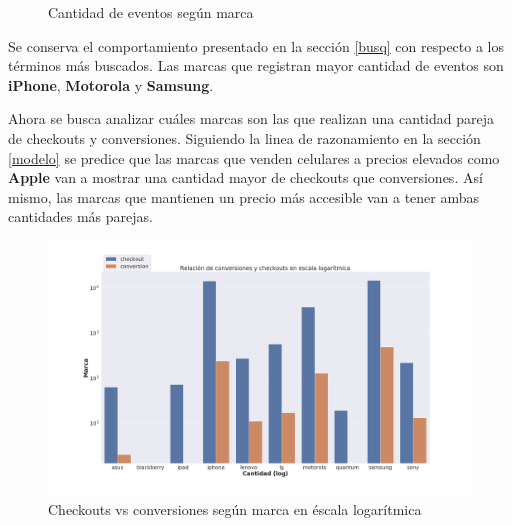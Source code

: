 \documentclass[a4paper]{article}
\begin{document}
\begin{figure}[!h]
	\caption{Cantidad de eventos según marca}
	\label{fig:freqbrands}
\end{figure}

Se conserva el comportamiento presentado en la sección \ref{busq} con respecto a los términos más buscados. Las marcas que registran mayor cantidad de eventos son \textbf{iPhone}, \textbf{Motorola} y \textbf{Samsung}.

Ahora se busca analizar cuáles marcas son las que realizan una cantidad pareja de checkouts y conversiones. Siguiendo la linea de razonamiento en la sección \ref{modelo} se predice que las marcas que venden celulares a precios elevados como \textbf{Apple} van a mostrar una cantidad mayor de checkouts que conversiones. Así mismo, las marcas que mantienen un precio más accesible van a tener ambas cantidades más parejas. 

\begin{figure}[!h]
	\includegraphics[width=\linewidth]{figures/142-conversiones_checkouts_marca-barplot.png}
	\caption{Checkouts vs conversiones según marca en éscala logarítmica}
	\label{fig:brands}
\end{figure}
\end{document}
